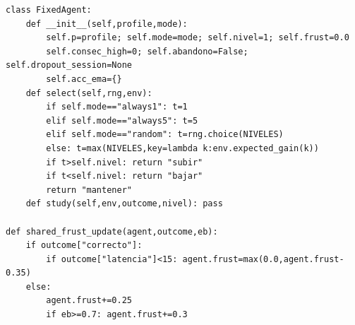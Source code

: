 \documentclass{article}
\begin{document}
\begin{verbatim}
class FixedAgent:
    def __init__(self,profile,mode):
        self.p=profile; self.mode=mode; self.nivel=1; self.frust=0.0
        self.consec_high=0; self.abandono=False; self.dropout_session=None
        self.acc_ema={}
    def select(self,rng,env):
        if self.mode=="always1": t=1
        elif self.mode=="always5": t=5
        elif self.mode=="random": t=rng.choice(NIVELES)
        else: t=max(NIVELES,key=lambda k:env.expected_gain(k))
        if t>self.nivel: return "subir"
        if t<self.nivel: return "bajar"
        return "mantener"
    def study(self,env,outcome,nivel): pass

def shared_frust_update(agent,outcome,eb):
    if outcome["correcto"]:
        if outcome["latencia"]<15: agent.frust=max(0.0,agent.frust-0.35)
    else:
        agent.frust+=0.25
        if eb>=0.7: agent.frust+=0.3
\end{verbatim}
\end{document}
